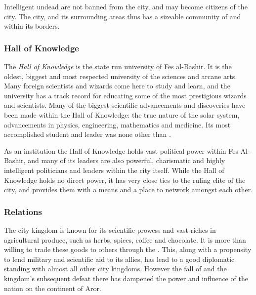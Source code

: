 Intelligent undead are not banned from the city, and may become citizens of
the city. The city, and its surrounding areas thus has a sizeable community of
 and  within its borders.

\subsubsection{Hall of Knowledge}
\label{sec:Hall of Knowledge}

The \emph{Hall of Knowledge} is the state run university of Fes al-Bashir. It
is the oldest, biggest and most respected university of the sciences and
arcane arts. Many foreign scientists and wizards come here to study and
learn, and the university has a track record for educating some of the most
prestigious wizards and scientists. Many of the biggest scientific
advancements and discoveries have been made within the Hall of Knowledge: the
true nature of the solar system, advancements in physics, engineering,
mathematics and medicine. Its most accomplished student and leader was none
other than .

As an institution the Hall of Knowledge holds vast political power within
Fes Al-Bashir, and many of its leaders are also powerful, charismatic and highly
intelligent politicians and leaders within the city itself. While the Hall of
Knowledge holds no direct power, it has very close ties to the ruling elite of
the city, and provides them with a means and a place to network amongst each
other.

\subsubsection{Relations}

The city kingdom is known for its scientific prowess and vast riches in
agricultural produce, such as herbs, spices, coffee and chocolate. It is more
than willing to trade these goods to others through the . This, along with a propensity to lend military and
scientific aid to its allies, has lead to a good diplomatic standing with
almost all other city kingdoms. However the fall of  and
the kingdom's subsequent defeat there has dampened the power and influence of
the nation on the continent of Aror.
